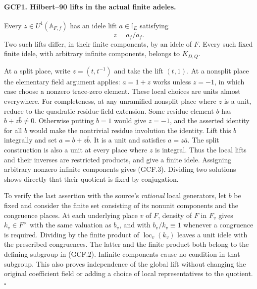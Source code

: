 \documentclass[11pt,a4paper]{article}
\numberwithin{equation}{section}
\theoremstyle{remark}\newtheorem{remark}[theorem]{Remark}
\begin{document}
\paragraph{GCF1. Hilbert--90 lifts in the actual finite adeles.}
\label{claim:GCF1}
Every \(z\in U^1(\mathbb A_{F,f})\) has an idele lift \(a\in
\mathbb I_E\) satisfying
\[
                         z=a_f/\bar a_f.             \tag{GCF.3}
\]
Two such lifts differ, in their finite components, by an idele of
\(F\).  Every such fixed finite idele, with arbitrary infinite
components, belongs to \(K_{D,Q}\).

At a split place, write \(z=(t,t^{-1})\) and take the lift
\((t,1)\).  At a nonsplit place the elementary field argument applies:
\(a=1+z\) works unless \(z=-1\), in which case choose a nonzero
trace-zero element.  These local choices are units almost everywhere.
For completeness, at any unramified nonsplit place where \(z\) is a
unit, reduce to the quadratic residue-field extension.  Some residue
element \(b\) has \(b+z\bar b\ne0\).  Otherwise putting \(b=1\)
would give \(z=-1\), and the asserted identity for all \(b\) would
make the nontrivial residue involution the identity.  Lift this \(b\)
integrally and set \(a=b+z\bar b\).  It is a unit and satisfies
\(a=z\bar a\).  The split construction is also a unit at every
place where \(z\) is integral.  Thus the local lifts and their inverses
are restricted products, and give a finite idele.  Assigning arbitrary
nonzero infinite components gives (GCF.3).  Dividing two solutions
shows directly that their quotient is fixed by conjugation.

To verify the last assertion with the source's \emph{rational} local
generators, let \(b\) be fixed and consider the finite set consisting
of its nonunit components and the congruence places.  At each underlying
place \(v\) of \(F\), density of \(F\) in \(F_v\) gives
\(k_v\in F^{\times}\) with the same valuation as \(b_v\), and with
\(b_v/k_v\equiv1\) whenever a congruence is required.  Dividing by
the finite product of \(\operatorname{loc}_v(k_v)\) leaves a unit
idele with the prescribed congruences.  The latter and the finite
product both belong to the defining subgroup in (GCF.2).
Infinite components cause no condition in that subgroup.  This also
proves independence of the global lift without changing the original
coefficient field or adding a choice of local representatives to the
quotient.
\hfill\(\square\)

\end{document}

